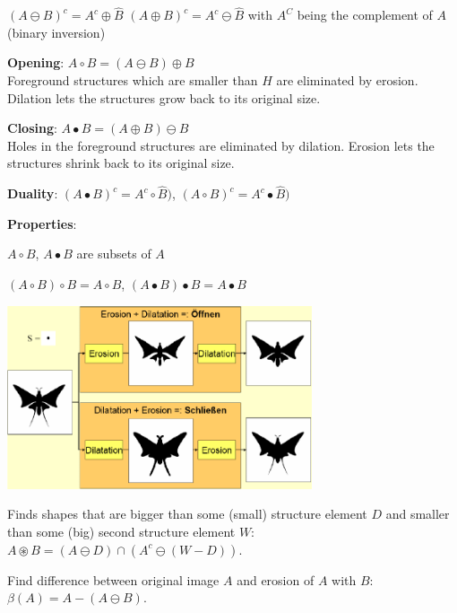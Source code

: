   
  $(A \ominus B)^c = A^c \oplus \hat{B}$ \qquad
  $(A \oplus B)^c = A^c \ominus \hat{B}$ \qquad with $A^C$ being the complement of $A$ (binary inversion)
  
  
  \begin{minipage}{10cm}
      \textbf{Opening}: $A \circ B = (A \ominus B) \oplus B$\\
      Foreground structures which are smaller than $H$ are eliminated by erosion. Dilation lets the
      structures grow back to its original size.  
      
    \textbf{Closing}: $A \bullet B = (A \oplus B) \ominus B$\\
      Holes in the foreground structures are eliminated by dilation. Erosion lets the
      structures shrink back to its original size.
      
    \textbf{Duality}: $(A \bullet B)^c = A^c \circ \hat{B})$, $(A \circ B)^c = A^c \bullet \hat{B})$
    
    \textbf{Properties}:
    \begin{liste}
      \item $A \circ B$, $A \bullet B$ are subsets of $A$
      \item $(A \circ B) \circ B = A \circ B$,  $(A \bullet B) \bullet B = A \bullet B$
    \end{liste}
  \end{minipage}
  \begin{minipage}{9cm}
    \includegraphics[width=9cm]{./images/morphology_opening_closing.png}
  \end{minipage}
  
  \vspace{1em}
  \begin{minipage}{9.2cm}
      Finds shapes that are bigger than some (small) structure element $D$ and smaller than some 
      (big) second structure element $W$: $A \circledast B = (A \ominus D) \cap (A^c \ominus (W-D))$.
  \end{minipage}
  \hspace{0.6cm}
  \begin{minipage}{9.2cm}
      Find difference between original image $A$ and erosion of $A$ with $B$: 
      $\beta(A) = A - (A \ominus B)$.
  \end{minipage}
  
